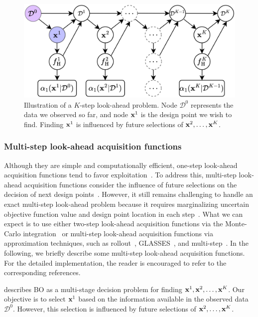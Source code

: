 \documentclass[iicol,sn-basic]{sn-jnl}%
\begin{document}
\begin{figure}
	\centering
	\includegraphics[scale=0.9]{Fig7.png}
	\caption{Illustration of a $K$-step look-ahead problem. Node $\mathcal{D}^0$ represents the data we observed so far, and node ${\bf x}^1$ is the design point we wish to find. Finding ${\bf x}^1$ is influenced by future selections of ${\bf x}^2,\dots,{\bf x}^K$.}
	\label{Fig7}
\end{figure}

\subsubsection{Multi-step look-ahead acquisition functions}\label{Sec514}

Although they are simple and computationally efficient, one-step look-ahead acquisition functions tend to favor exploitation~\citep{Hennig2022}.
To address this, multi-step look-ahead acquisition functions consider the influence of future selections on the decision of next design points~\citep[see e.g.,][]{Streltsov1999,Ginsbourger2010}.
However, it still remains challenging to handle an exact multi-step look-ahead problem because it requires marginalizing uncertain objective function value and design point location in each step~\citep{Gonzalez2016}.
What we can expect is to use either
two-step look-ahead acquisition functions via the Monte-Carlo integration~\citep{WuJ2019} or multi-step look-ahead acquisition functions via approximation techniques, such as rollout~\citep{Lam2016,Lee2020}, GLASSES~\citep{Gonzalez2016}, and multi-step~\citep{Jiang2020}.
In the following, we briefly describe some multi-step look-ahead acquisition functions.
For the detailed implementation, the reader is encouraged to refer to the corresponding references.

 describes BO as a multi-stage decision problem for finding ${\bf x}^1,{\bf x}^2,\dots,{\bf x}^{K}$.
Our objective is to select ${\bf x}^1$ based on the information available in the observed data $\mathcal{D}^0$.
However, this selection is influenced by future selections of ${\bf x}^2,\dots,{\bf x}^{K}$.
\end{document}
